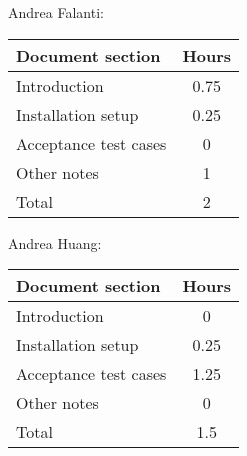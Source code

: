 Andrea Falanti:

\begin{tabular}{|l|c|}
    \hline
    Document section & Hours\\
    \hline
     Introduction & 0.75\\
     Installation setup & 0.25\\
     Acceptance test cases & 0\\
     Other notes & 1\\
     \hline
     Total & 2\\
     \hline
\end{tabular}

\vskip 0.3in

Andrea Huang:

\begin{tabular}{|l|c|}
    \hline
    Document section & Hours \\
    \hline
     Introduction & 0\\
     Installation setup & 0.25\\
     Acceptance test cases & 1.25\\
     Other notes & 0\\
     \hline
     Total & 1.5\\
     \hline
\end{tabular}